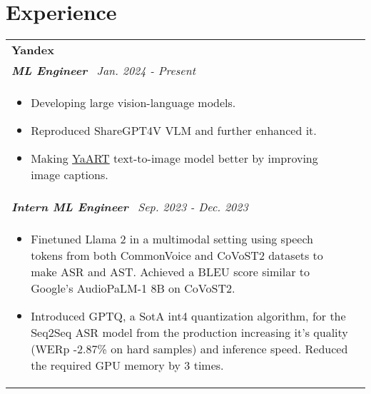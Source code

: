 \documentclass[a4paper,8pt]{article}
\begin{document}
\section{Experience}
\begin{tabularx}{\linewidth}{ @{}l r@{} }
\textbf{Yandex} \\[4pt]
\color[HTML]{371e77}\textbf{\textit{ML Engineer}}\ \hfill \color[HTML]{4B28A4} \textit{Jan. 2024 - Present} \\[5pt]
\begin{minipage}[t]{\linewidth}
    \begin{itemize}[nosep,after=\strut, leftmargin=2em, itemsep=2pt]
        \item Developing large vision-language models.
        \item Reproduced ShareGPT4V VLM and further enhanced it.
        \item Making \href{https://ya.ru/ai/art/paper-yaart-v1}{YaART} text-to-image model better by improving image captions.
    \end{itemize}
\end{minipage} \\

\color[HTML]{371e77}\textbf{\textit{Intern ML Engineer}}\ \hfill \color[HTML]{4B28A4} \textit{Sep. 2023 - Dec. 2023} \\[5pt]
\begin{minipage}[t]{\linewidth}
    \begin{itemize}[nosep,after=\strut, leftmargin=2em, itemsep=2pt]
        \item Finetuned Llama 2 in a multimodal setting using speech tokens from both CommonVoice and CoVoST2 datasets to make ASR and AST. Achieved a BLEU score similar to Google's AudioPaLM-1 8B on CoVoST2.
        \item Introduced GPTQ, a SotA int4 quantization algorithm, for the Seq2Seq ASR model from the production increasing it’s quality (WERp -2.87\% on hard samples) and inference speed. Reduced the required GPU memory by 3 times.
    \end{itemize}
\end{minipage}
\end{tabularx}
\end{document}

